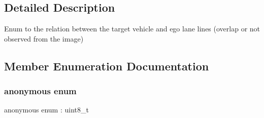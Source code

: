 \subsection{Detailed Description}
Enum to the relation between the target vehicle and ego lane lines (overlap or not observed from the image) 

\subsection{Member Enumeration Documentation}
\mbox{\label{structmaf__perception__interface_1_1VehicleEgoLaneRelationEnum_adbab113da26395a3812ef94c6013ea1a}} 
\subsubsection{\texorpdfstring{anonymous enum}{anonymous enum}}
{\footnotesize\ttfamily anonymous enum \+: uint8\+\_\+t}

